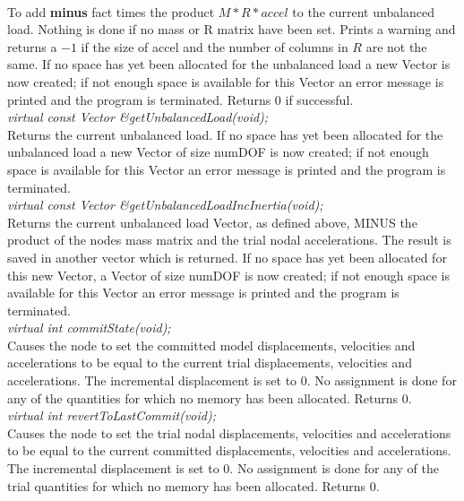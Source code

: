  \\ 
To add {\bf minus} \p fact times the product $M * R * accel$ to the
current unbalanced load. Nothing is done if no mass or R matrix have
been set. Prints a warning and returns a $-1$ if the size of accel and
the number of columns in $R$ are not the same. If no space has yet been
allocated for the unbalanced load a new Vector is now created;  
if not enough space is available for this Vector an error message is
printed and the program is terminated. Returns $0$ if successful.  \\ 

{\em virtual const Vector \&getUnbalancedLoad(void);} \\
Returns the current unbalanced load. If no space has yet been
allocated for the unbalanced load a new Vector of size \p numDOF is
now created; if not enough space is available for this Vector an error
message is printed and the program is terminated. \\ 

{\em virtual const Vector \&getUnbalancedLoadIncInertia(void);} \\
Returns the current unbalanced load Vector, as defined above, MINUS the product
of the nodes mass matrix and the trial nodal accelerations. The result
is saved in another vector which is returned. If no space has yet been
allocated for this new Vector, a Vector of size \p numDOF is now
created; if not enough space is available for this Vector an error
message is printed and the program is terminated. \\ 

{\em virtual int commitState(void);} \\
Causes the node to set the committed model displacements, velocities and
accelerations to be equal to the current trial displacements, velocities and
accelerations. The incremental displacement is set to $0$. No assignment is done 
for any of the quantities for
which no memory has been allocated. Returns $0$.\\

{\em virtual int revertToLastCommit(void);} \\
Causes the node to set the trial nodal displacements, velocities and
accelerations to be equal to the current committed displacements, velocities and
accelerations. The incremental displacement is set to $0$. No assignment is done 
for any of the trial quantities for which no memory has been allocated. Returns $0$.\\

